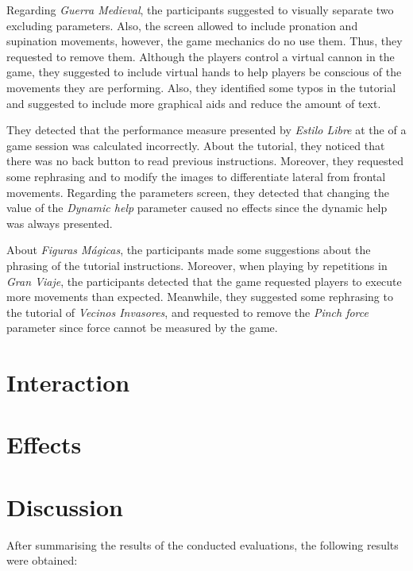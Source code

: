Regarding \textit{Guerra Medieval}, the participants suggested to visually separate two excluding parameters. Also, the screen allowed to include pronation and supination movements, however, the game mechanics do no use them. Thus, they requested to remove them. Although the players control a virtual cannon in the game, they suggested to include virtual hands to help players be conscious of the movements they are performing. Also, they identified some typos in the tutorial and suggested to include more graphical aids and reduce the amount of text.

They detected that the performance measure presented by \textit{Estilo Libre} at the of a game session was calculated incorrectly. About the tutorial, they noticed that there was no back button to read previous instructions. Moreover, they requested some rephrasing and to modify the images to differentiate lateral from frontal movements. Regarding the parameters screen, they detected that changing the value of the \textit{Dynamic help} parameter caused no effects since the dynamic help was always presented.

About \textit{Figuras Mágicas}, the participants made some suggestions about the phrasing of the tutorial instructions. Moreover, when playing by repetitions in \textit{Gran Viaje}, the participants detected that the game requested players to execute more movements than expected. Meanwhile, they suggested some rephrasing to the tutorial of \textit{Vecinos Invasores}, and requested to remove the \textit{Pinch force} parameter since force cannot be measured by the game.

\section{Interaction}
\label{sec:interaction_eval}

\section{Effects}

\section{Discussion}
After summarising the results of the conducted evaluations, the following results were obtained:

